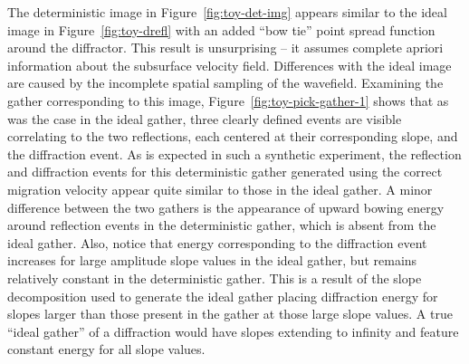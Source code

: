 The deterministic image in Figure~\ref{fig:toy-det-img} appears similar to the ideal image in Figure~\ref{fig:toy-drefl} with an added  ``bow tie'' point spread function around the diffractor.  This result is unsurprising -- it assumes complete apriori information about the subsurface velocity field.   Differences with the ideal image are caused by the incomplete spatial sampling of the wavefield.  Examining the gather corresponding to this image, Figure~\ref{fig:toy-pick-gather-1} shows that as was the case in the ideal gather, three clearly defined events are visible correlating to the two reflections, each centered at their corresponding slope, and the diffraction event. As is expected in such a synthetic experiment, the reflection and diffraction events for this deterministic gather generated using the correct migration velocity appear quite similar to those in the ideal gather.  A minor difference between the two gathers is the appearance of upward bowing energy around reflection events in the deterministic gather, which is absent from the ideal gather.  Also, notice that energy corresponding to the diffraction event increases for large amplitude slope values in the ideal gather, but remains relatively constant in the deterministic gather.  This is a result of  the slope decomposition used to generate the ideal gather placing diffraction energy for slopes larger than those present in the gather at those large slope values.  A true ``ideal gather'' of a diffraction would have slopes extending to infinity and feature constant energy for all slope values.


